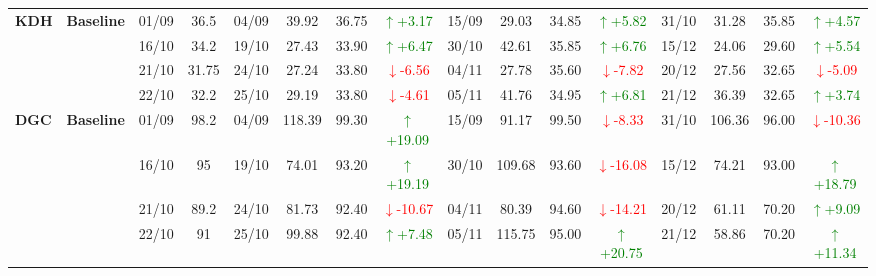 {\begin{longtable}{llcc|cccc|cccc|cccc}
\multirow{4}{*}{\textbf{KDH}}
& \textbf{Baseline}
& 01/09 & 36.5 & 04/09 & 39.92 & 36.75 & \textcolor{green}{\(\uparrow\)+3.17} & 15/09 & 29.03 & 34.85 & \textcolor{green}{\(\uparrow\)+5.82} & 31/10 & 31.28 & 35.85 & \textcolor{green}{\(\uparrow\)+4.57} \\
& & 16/10 & 34.2 & 19/10 & 27.43 & 33.90 & \textcolor{green}{\(\uparrow\)+6.47} & 30/10 & 42.61 & 35.85 & \textcolor{green}{\(\uparrow\)+6.76} & 15/12 & 24.06 & 29.60 & \textcolor{green}{\(\uparrow\)+5.54} \\
& & 21/10 & 31.75 & 24/10 & 27.24 & 33.80 & \textcolor{red}{\(\downarrow\)-6.56} & 04/11 & 27.78 & 35.60 & \textcolor{red}{\(\downarrow\)-7.82} & 20/12 & 27.56 & 32.65 & \textcolor{red}{\(\downarrow\)-5.09} \\
& & 22/10 & 32.2 & 25/10 & 29.19 & 33.80 & \textcolor{red}{\(\downarrow\)-4.61} & 05/11 & 41.76 & 34.95 & \textcolor{green}{\(\uparrow\)+6.81} & 21/12 & 36.39 & 32.65 & \textcolor{green}{\(\uparrow\)+3.74} \\
\midrule

\multirow{4}{*}{\textbf{DGC}}
& \textbf{Baseline}
& 01/09 & 98.2 & 04/09 & 118.39 & 99.30 & \textcolor{green}{\(\uparrow\)+19.09} & 15/09 & 91.17 & 99.50 & \textcolor{red}{\(\downarrow\)-8.33} & 31/10 & 106.36 & 96.00 & \textcolor{red}{\(\downarrow\)-10.36} \\
& & 16/10 & 95 & 19/10 & 74.01 & 93.20 & \textcolor{green}{\(\uparrow\)+19.19} & 30/10 & 109.68 & 93.60 & \textcolor{red}{\(\downarrow\)-16.08} & 15/12 & 74.21 & 93.00 & \textcolor{green}{\(\uparrow\)+18.79} \\
& & 21/10 & 89.2 & 24/10 & 81.73 & 92.40 & \textcolor{red}{\(\downarrow\)-10.67} & 04/11 & 80.39 & 94.60 & \textcolor{red}{\(\downarrow\)-14.21} & 20/12 & 61.11 & 70.20 & \textcolor{green}{\(\uparrow\)+9.09} \\
& & 22/10 & 91 & 25/10 & 99.88 & 92.40 & \textcolor{green}{\(\uparrow\)+7.48} & 05/11 & 115.75 & 95.00 & \textcolor{green}{\(\uparrow\)+20.75} & 21/12 & 58.86 & 70.20 & \textcolor{green}{\(\uparrow\)+11.34} \\
\midrule


\end{longtable}}
